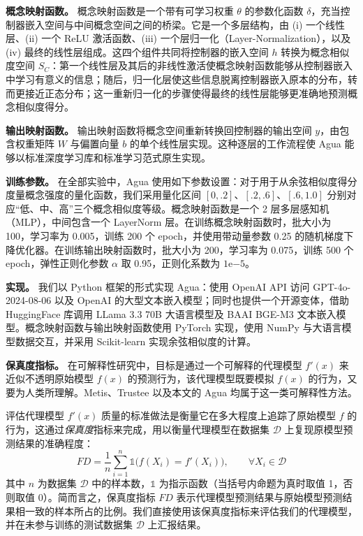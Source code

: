\documentclass[11pt,a4paper]{article}
\begin{document}
\textbf{概念映射函数。} 概念映射函数是一个带有可学习权重 $\theta$ 的参数化函数 $\delta$，充当控制器嵌入空间与中间概念空间之间的桥梁。它是一个多层结构，由 (i) 一个线性层、(ii) 一个 ReLU 激活函数、(iii) 一个层归一化（Layer-Normalization），以及 (iv) 最终的线性层组成。这四个组件共同将控制器的嵌入空间 $h$ 转换为概念相似度空间 $S_C$：第一个线性层及其后的非线性激活使概念映射函数能够从控制器嵌入中学习有意义的信息；随后，归一化层使这些信息脱离控制器嵌入原本的分布，转而更接近正态分布；这一重新归一化的步骤使得最终的线性层能够更准确地预测概念相似度得分。

\textbf{输出映射函数。} 输出映射函数将概念空间重新转换回控制器的输出空间 $y$，由包含权重矩阵 $W$ 与偏置向量 $b$ 的单个线性层实现。这种逐层的工作流程使 Agua 能够以标准深度学习库和标准学习范式原生实现。

\textbf{训练参数。} 在全部实验中，Agua 使用如下参数设置：对于用于从余弦相似度得分度量概念强度的量化函数，我们采用量化区间 $[0,.2]$、$[.2,.6]$、$[.6,1.0]$ 分别对应“低、中、高”三个概念相似度等级。概念映射函数是一个 2 层多层感知机（MLP），中间包含一个 LayerNorm 层。在训练概念映射函数时，批大小为 100，学习率为 0.005，训练 200 个 epoch，并使用带动量参数 0.25 的随机梯度下降优化器。在训练输出映射函数时，批大小为 200，学习率为 0.075，训练 500 个 epoch，弹性正则化参数 $\alpha$ 取 0.95，正则化系数为 $1\mathrm{e}{-5}$。

\textbf{实现。} 我们以 Python 框架的形式实现 Agua：使用 OpenAI API 访问 GPT-4o-2024-08-06 以及 OpenAI 的大型文本嵌入模型；同时也提供一个开源变体，借助 HuggingFace 库调用 LLama 3.3 70B 大语言模型及 BAAI BGE-M3 文本嵌入模型。概念映射函数与输出映射函数使用 PyTorch 实现，使用 NumPy 与大语言模型数据交互，并采用 Scikit-learn 实现余弦相似度的计算。

\textbf{保真度指标。} 在可解释性研究中，目标是通过一个可解释的代理模型 $f'(x)$ 来近似不透明原始模型 $f(x)$ 的预测行为，该代理模型既要模拟 $f(x)$ 的行为，又要为人类所理解。Metis、Trustee 以及本文的 Agua 均属于这一类可解释性方法。

评估代理模型 $f'(x)$ 质量的标准做法是衡量它在多大程度上追踪了原始模型 $f$ 的行为，这通过\emph{保真度}指标来完成，用以衡量代理模型在数据集 $\mathcal{D}$ 上复现原模型预测结果的准确程度：
\begin{equation}
FD = \frac{1}{n}\sum_{i=1}^{n} \mathbb{1}\big(f(X_i) = f'(X_i)\big), \qquad \forall X_i\in\mathcal{D}
\label{eq:fidelity}
\end{equation}
其中 $n$ 为数据集 $\mathcal{D}$ 中的样本数，$\mathbb{1}$ 为指示函数（当括号内命题为真时取值 1，否则取值 0）。简而言之，保真度指标 $FD$ 表示代理模型预测结果与原始模型预测结果相一致的样本所占的比例。我们直接使用该保真度指标来评估我们的代理模型，并在未参与训练的测试数据集 $\mathcal{D}$ 上汇报结果。
\end{document}
